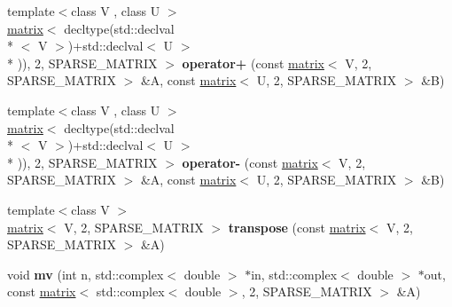 \begin{DoxyCompactItemize}
\item 
\hypertarget{classkeycpp_1_1matrix_3_01_t_00_012_00_01_s_p_a_r_s_e___m_a_t_r_i_x_01_4_acf84d8e097abee1bf84a723645bb9dd6}{{\footnotesize template$<$class V , class U $>$ }\\\hyperlink{classkeycpp_1_1matrix}{matrix}$<$ decltype(std\-::declval\\*
$<$ V $>$)+std\-::declval$<$ U $>$\\*
)), 2, S\-P\-A\-R\-S\-E\-\_\-\-M\-A\-T\-R\-I\-X $>$ {\bfseries operator+} (const \hyperlink{classkeycpp_1_1matrix}{matrix}$<$ V, 2, S\-P\-A\-R\-S\-E\-\_\-\-M\-A\-T\-R\-I\-X $>$ \&A, const \hyperlink{classkeycpp_1_1matrix}{matrix}$<$ U, 2, S\-P\-A\-R\-S\-E\-\_\-\-M\-A\-T\-R\-I\-X $>$ \&B)}\label{classkeycpp_1_1matrix_3_01_t_00_012_00_01_s_p_a_r_s_e___m_a_t_r_i_x_01_4_acf84d8e097abee1bf84a723645bb9dd6}

\item 
\hypertarget{classkeycpp_1_1matrix_3_01_t_00_012_00_01_s_p_a_r_s_e___m_a_t_r_i_x_01_4_a1f4e330b8bc16400ede05b08d3d2116e}{{\footnotesize template$<$class V , class U $>$ }\\\hyperlink{classkeycpp_1_1matrix}{matrix}$<$ decltype(std\-::declval\\*
$<$ V $>$)+std\-::declval$<$ U $>$\\*
)), 2, S\-P\-A\-R\-S\-E\-\_\-\-M\-A\-T\-R\-I\-X $>$ {\bfseries operator-\/} (const \hyperlink{classkeycpp_1_1matrix}{matrix}$<$ V, 2, S\-P\-A\-R\-S\-E\-\_\-\-M\-A\-T\-R\-I\-X $>$ \&A, const \hyperlink{classkeycpp_1_1matrix}{matrix}$<$ U, 2, S\-P\-A\-R\-S\-E\-\_\-\-M\-A\-T\-R\-I\-X $>$ \&B)}\label{classkeycpp_1_1matrix_3_01_t_00_012_00_01_s_p_a_r_s_e___m_a_t_r_i_x_01_4_a1f4e330b8bc16400ede05b08d3d2116e}

\item 
\hypertarget{classkeycpp_1_1matrix_3_01_t_00_012_00_01_s_p_a_r_s_e___m_a_t_r_i_x_01_4_a5b258b115970ad79cf09c123b8af1101}{{\footnotesize template$<$class V $>$ }\\\hyperlink{classkeycpp_1_1matrix}{matrix}$<$ V, 2, S\-P\-A\-R\-S\-E\-\_\-\-M\-A\-T\-R\-I\-X $>$ {\bfseries transpose} (const \hyperlink{classkeycpp_1_1matrix}{matrix}$<$ V, 2, S\-P\-A\-R\-S\-E\-\_\-\-M\-A\-T\-R\-I\-X $>$ \&A)}\label{classkeycpp_1_1matrix_3_01_t_00_012_00_01_s_p_a_r_s_e___m_a_t_r_i_x_01_4_a5b258b115970ad79cf09c123b8af1101}

\item 
\hypertarget{classkeycpp_1_1matrix_3_01_t_00_012_00_01_s_p_a_r_s_e___m_a_t_r_i_x_01_4_ac73eba4c2e3f7646e4bd09d6a23a8dc0}{void {\bfseries mv} (int n, std\-::complex$<$ double $>$ $\ast$in, std\-::complex$<$ double $>$ $\ast$out, const \hyperlink{classkeycpp_1_1matrix}{matrix}$<$ std\-::complex$<$ double $>$, 2, S\-P\-A\-R\-S\-E\-\_\-\-M\-A\-T\-R\-I\-X $>$ \&A)}\label{classkeycpp_1_1matrix_3_01_t_00_012_00_01_s_p_a_r_s_e___m_a_t_r_i_x_01_4_ac73eba4c2e3f7646e4bd09d6a23a8dc0}


\end{DoxyCompactItemize}
